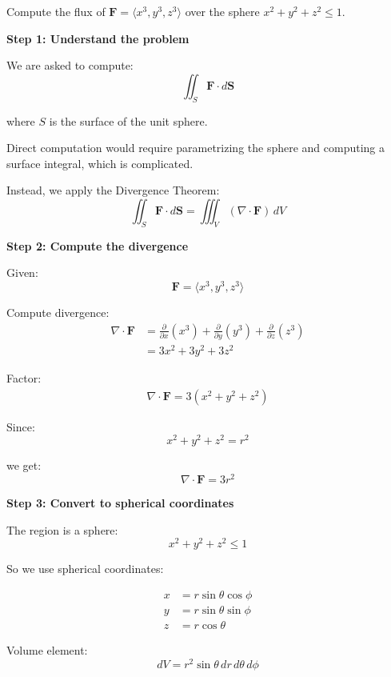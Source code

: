 \begin{examplebox}
    Compute the flux of $\mathbf{F}=\langle x^3,y^3,z^3\rangle$ over the sphere $x^2+y^2+z^2\le1$.

    \textbf{Step 1: Understand the problem}

    We are asked to compute:
    \[
        \iint_S \mathbf{F}\cdot d\mathbf{S}
    \]

    where $S$ is the surface of the unit sphere.

    Direct computation would require parametrizing the sphere and computing a surface integral, which is complicated.

    Instead, we apply the Divergence Theorem:
    \[
        \iint_S \mathbf{F}\cdot d\mathbf{S}
        =
        \iiint_V (\nabla \cdot \mathbf{F})\, dV
    \]

    \textbf{Step 2: Compute the divergence}

    Given:
    \[
        \mathbf{F} = \langle x^3,y^3,z^3\rangle
    \]

    Compute divergence:
    \begin{align*}
        \nabla \cdot \mathbf{F}
         & = \frac{\partial}{\partial x}(x^3) + \frac{\partial}{\partial y}(y^3) + \frac{\partial}{\partial z}(z^3) \\
         & = 3x^2 + 3y^2 + 3z^2
    \end{align*}

    Factor:
    \begin{align*}
        \nabla \cdot \mathbf{F} = 3(x^2+y^2+z^2)
    \end{align*}

    Since:
    \[
        x^2+y^2+z^2 = r^2
    \]

    we get:
    \[
        \nabla \cdot \mathbf{F} = 3r^2
    \]

    \textbf{Step 3: Convert to spherical coordinates}

    The region is a sphere:
    \[
        x^2+y^2+z^2 \le 1
    \]

    So we use spherical coordinates:

    \begin{align*}
        x & = r\sin\theta\cos\phi \\
        y & = r\sin\theta\sin\phi \\
        z & = r\cos\theta
    \end{align*}

    Volume element:
    \[
        dV = r^2\sin\theta\,dr\,d\theta\,d\phi
    \]


\end{examplebox}
